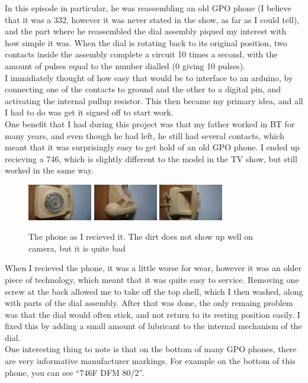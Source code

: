 \documentclass[12pt]{article}
\begin{document}
In this episode in particular, he was reassembling an old GPO phone 
(I believe that it was a 332, however it was never stated in the show, as far as I could tell),
and the part where he reassembled the dial assembly piqued my interest with how simple it was.
When the dial is rotating back to its original position, 
two contacts inside the assembly complete a circuit 10 times a second, 
with the amount of pulses equal to the number dialled (0 giving 10 pulses).\\
I immidiately thought of how easy that would be to interface to an arduino, 
by connecting one of the contacts to ground and the other to a digital pin, 
and activating the internal pullup resistor. This then became my primary idea, 
and all I had to do was get it signed off to start work.\\
One benefit that I had during this project was that my father worked in BT for many years,
and even though he had left, he still had several contacts, 
which meant that it was surprisingly easy to get hold of an old GPO phone.
I ended up recieving a 746, which is slightly different to the model in the TV show,
but still worked in the same way.\\

\begin{figure}[h]
    \centering
    \includegraphics[width=0.25\textwidth]{PhoneFront}
    \includegraphics[width=0.25\textwidth]{PhoneSide}
    \includegraphics[width=0.25\textwidth]{PhoneBack}
    \caption{The phone as I recieved it. The dirt does not show up well on camera, but it is quite bad}
\end{figure}

When I recieved the phone, it was a little worse for wear,
however it was an older piece of technology, which meant that it was quite easy to service.
Removing one screw at the back allowed me to take off the top shell, which I then washed,
along with parts of the dial assembly. After that was done, 
the only remaing problem was that the dial would often stick, 
and not return to its resting position easily. 
I fixed this by adding a small amount of lubricant to the internal mechanism of the dial.\\
One interesting thing to note is that on the bottom of many GPO phones, there are very informative manufacturer markings. 
For example on the bottom of this phone, you can see ``746F DFM 80/2''.
\end{document}
